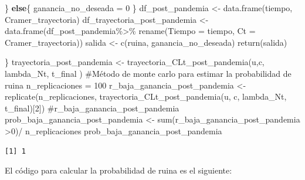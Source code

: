 \documentclass[
  us-letterpaper,
]{scrreprt}
\newenvironment{Shaded}{\begin{snugshade}}{\end{snugshade}}
\newcommand{\AttributeTok}[1]{\textcolor[rgb]{0.40,0.45,0.13}{#1}}
\newcommand{\CommentTok}[1]{\textcolor[rgb]{0.37,0.37,0.37}{#1}}
\newcommand{\ControlFlowTok}[1]{\textcolor[rgb]{0.00,0.23,0.31}{\textbf{#1}}}
\newcommand{\DecValTok}[1]{\textcolor[rgb]{0.68,0.00,0.00}{#1}}
\newcommand{\FunctionTok}[1]{\textcolor[rgb]{0.28,0.35,0.67}{#1}}
\newcommand{\NormalTok}[1]{\textcolor[rgb]{0.00,0.23,0.31}{#1}}
\newcommand{\OtherTok}[1]{\textcolor[rgb]{0.00,0.23,0.31}{#1}}
\newcommand{\SpecialCharTok}[1]{\textcolor[rgb]{0.37,0.37,0.37}{#1}}
\theoremstyle{plain}
\theoremstyle{plain}
\theoremstyle{definition}
\theoremstyle{remark}
\begin{document}
\begin{Shaded}
\begin{Highlighting}[]
\NormalTok{  \} }
  \ControlFlowTok{else}\NormalTok{\{}
\NormalTok{    ganancia\_no\_deseada }\OtherTok{=} \DecValTok{0}
\NormalTok{  \}}
\NormalTok{  df\_post\_pandemia }\OtherTok{\textless{}{-}} \FunctionTok{data.frame}\NormalTok{(tiempo, Cramer\_trayectoria)}
\NormalTok{  df\_trayectoria\_post\_pandemia }\OtherTok{\textless{}{-}} \FunctionTok{data.frame}\NormalTok{(df\_post\_pandemia}\SpecialCharTok{\%\textgreater{}\%}
                                            \FunctionTok{rename}\NormalTok{(}\AttributeTok{Tiempo =}\NormalTok{ tiempo, }
                                            \AttributeTok{Ct =}\NormalTok{ Cramer\_trayectoria))}
\NormalTok{  salida }\OtherTok{\textless{}{-}} \FunctionTok{c}\NormalTok{(ruina, ganancia\_no\_deseada)}
  \FunctionTok{return}\NormalTok{(salida)}
  
\NormalTok{\}}
\NormalTok{trayectoria\_post\_pandemia }\OtherTok{\textless{}{-}} \FunctionTok{trayectoria\_CLt\_post\_pandemia}\NormalTok{(u,c,}
\NormalTok{                                            lambda\_Nt, t\_final )}
\CommentTok{\#Método de monte carlo para estimar la probabilidad de ruina}
\NormalTok{n\_replicaciones }\OtherTok{=} \DecValTok{100}
\NormalTok{r\_baja\_ganancia\_post\_pandemia }\OtherTok{\textless{}{-}} \FunctionTok{replicate}\NormalTok{(n\_replicaciones, }
          \FunctionTok{trayectoria\_CLt\_post\_pandemia}\NormalTok{(u, c, lambda\_Nt, t\_final)[}\DecValTok{2}\NormalTok{])}
\CommentTok{\#r\_baja\_ganancia\_post\_pandemia }
\NormalTok{prob\_baja\_ganancia\_post\_pandemia }\OtherTok{\textless{}{-}} \FunctionTok{sum}\NormalTok{(r\_baja\_ganancia\_post\_pandemia }\SpecialCharTok{\textgreater{}}\DecValTok{0}\NormalTok{)}\SpecialCharTok{/}
\NormalTok{n\_replicaciones}
\NormalTok{prob\_baja\_ganancia\_post\_pandemia}
\end{Highlighting}
\end{Shaded}

\begin{verbatim}
[1] 1
\end{verbatim}

El código para calcular la probabilidad de ruina es el siguiente:
\end{document}
